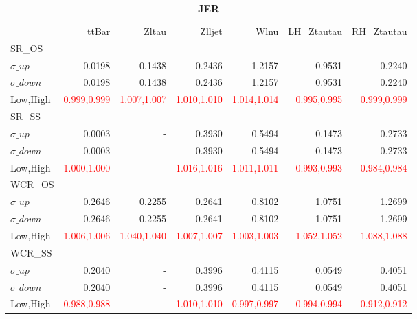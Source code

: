 \documentclass[11pt,oneside,a4paper]{article}
\begin{document}
\begin{table}
\caption{\bf{JER}}
\centering
\begin{tabular}{lrrrrrr}
& ttBar & Zltau & Zlljet & Wlnu & LH\_Ztautau & RH\_Ztautau \\

SR\_OS &  &  &  &  &  &  \\
$\sigma\_up$ & 0.0198 & 0.1438 & 0.2436 & 1.2157 & 0.9531 & 0.2240 \\
$\sigma\_down$ & 0.0198 & 0.1438 & 0.2436 & 1.2157 & 0.9531 & 0.2240 \\
Low,High & \textcolor{red}{0.999,0.999} & \textcolor{red}{1.007,1.007} & \textcolor{red}{1.010,1.010} & \textcolor{red}{1.014,1.014} & \textcolor{red}{0.995,0.995} & \textcolor{red}{0.999,0.999} \\

\hline
SR\_SS &  &  &  &  &  &  \\
$\sigma\_up$ & 0.0003 & - & 0.3930 & 0.5494 & 0.1473 & 0.2733 \\
$\sigma\_down$ & 0.0003 & - & 0.3930 & 0.5494 & 0.1473 & 0.2733 \\
Low,High & \textcolor{red}{1.000,1.000} & - & \textcolor{red}{1.016,1.016} & \textcolor{red}{1.011,1.011} & \textcolor{red}{0.993,0.993} & \textcolor{red}{0.984,0.984} \\

\hline
WCR\_OS &  &  &  &  &  &  \\
$\sigma\_up$ & 0.2646 & 0.2255 & 0.2641 & 0.8102 & 1.0751 & 1.2699 \\
$\sigma\_down$ & 0.2646 & 0.2255 & 0.2641 & 0.8102 & 1.0751 & 1.2699 \\
Low,High & \textcolor{red}{1.006,1.006} & \textcolor{red}{1.040,1.040} & \textcolor{red}{1.007,1.007} & \textcolor{red}{1.003,1.003} & \textcolor{red}{1.052,1.052} & \textcolor{red}{1.088,1.088} \\

\hline
WCR\_SS &  &  &  &  &  &  \\
$\sigma\_up$ & 0.2040 & - & 0.3996 & 0.4115 & 0.0549 & 0.4051 \\
$\sigma\_down$ & 0.2040 & - & 0.3996 & 0.4115 & 0.0549 & 0.4051 \\
Low,High & \textcolor{red}{0.988,0.988} & - & \textcolor{red}{1.010,1.010} & \textcolor{red}{0.997,0.997} & \textcolor{red}{0.994,0.994} & \textcolor{red}{0.912,0.912} \\

\end{tabular}
\end{table}
\end{document}
